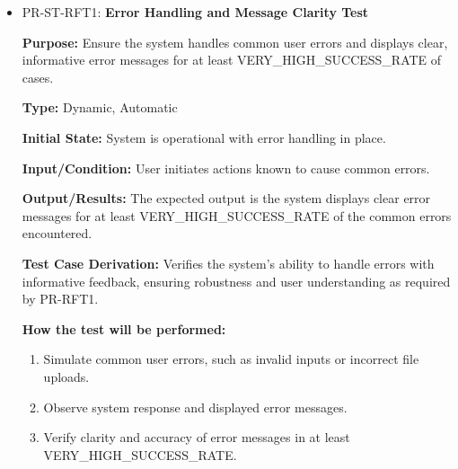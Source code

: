 \documentclass[12pt, titlepage]{article}
\begin{document}
\begin{itemize}
  \item PR-ST-RFT1: \textbf{Error Handling and Message Clarity Test}
  \begin{mdframed}[linewidth=0.5mm]
      \textbf{Purpose:} Ensure the system handles common user errors and displays clear, informative error messages for at least VERY\_HIGH\_SUCCESS\_RATE of cases. \par
      \textbf{Type:} Dynamic, Automatic \par
      \textbf{Initial State:} System is operational with error handling in place. \par
      \textbf{Input/Condition:} User initiates actions known to cause common errors. \par
      \textbf{Output/Results:} The expected output is the system displays clear error messages for at least VERY\_HIGH\_SUCCESS\_RATE of the common errors encountered. \par
      \textbf{Test Case Derivation:} Verifies the system’s ability to handle errors with \\ informative feedback, ensuring robustness and user understanding as required by PR-RFT1. \par
      \textbf{How the test will be performed:}
      \begin{enumerate}[noitemsep]
        \item Simulate common user errors, such as invalid inputs or incorrect file uploads.
        \item Observe system response and displayed error messages.
        \item Verify clarity and accuracy of error messages in at least \\ VERY\_HIGH\_SUCCESS\_RATE.
      \end{enumerate}
  \end{mdframed}


\end{itemize}
\end{document}

